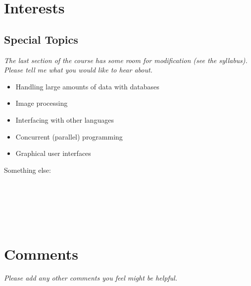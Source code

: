 \documentclass[article,twoside]{memoir}
\newcommand*{\fillunderscore}{~\hrulefill}
\newcommand*{\checkbox}{$\square$}
\newcommand{\header}[1]{\textsl{#1}}
\begin{document}
\chapter{Interests}

\section{Special Topics}

\header{The last section of the course has some room for modification (see the syllabus). Please tell me what you would like to hear about.}

\begin{itemize}[\checkbox]
\item Handling large amounts of data with databases
\item Image processing
\item Interfacing with other languages
\item Concurrent (parallel) programming
\item Graphical user interfaces
\end{itemize}

Something else: \fillunderscore\par
\fillunderscore\par
\fillunderscore\par
\fillunderscore

\chapter{Comments}

\header{Please add any other comments you feel might be helpful.}

\fillunderscore\par
\fillunderscore\par
\fillunderscore\par
\fillunderscore\par
\fillunderscore\par
\fillunderscore\par
\fillunderscore\par
\fillunderscore\par
\fillunderscore
\end{document}
